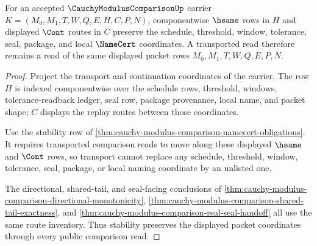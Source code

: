 \begin{theorem}
\label{thm:cauchy-modulus-comparison-transport-route-stability}
For an accepted $\CauchyModulusComparisonUp$ carrier $K=(M_0,M_1,T,W,Q,E,H,C,P,N)$, componentwise $\hsame$ rows in $H$ and displayed $\Cont$ routes in $C$ preserve the schedule, threshold, window, tolerance, seal, package, and local $\NameCert$ coordinates. A transported read therefore remains a read of the same displayed packet rows $M_0,M_1,T,W,Q,E,P,N$.
\end{theorem}
\begin{proof}
Project the transport and continuation coordinates of the carrier. The row $H$ is indexed componentwise over the schedule rows, threshold, windows, tolerance-readback ledger, seal row, package provenance, local name, and packet shape; $C$ displays the replay routes between those coordinates.

Use the stability row of \autoref{thm:cauchy-modulus-comparison-namecert-obligations}. It requires transported comparison reads to move along these displayed $\hsame$ and $\Cont$ rows, so transport cannot replace any schedule, threshold, window, tolerance, seal, package, or local naming coordinate by an unlisted one.

The directional, shared-tail, and seal-facing conclusions of \autoref{thm:cauchy-modulus-comparison-directional-monotonicity}, \autoref{thm:cauchy-modulus-comparison-shared-tail-exactness}, and \autoref{thm:cauchy-modulus-comparison-real-seal-handoff} all use the same route inventory. Thus stability preserves the displayed packet coordinates through every public comparison read.
\end{proof}

